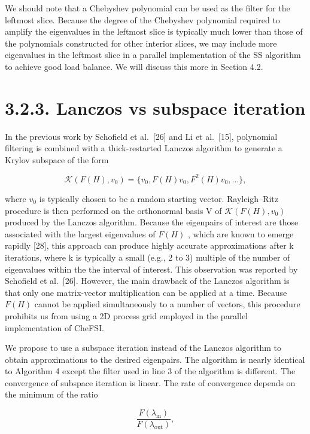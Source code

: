 \documentclass[
  10
]{article}
\begin{document}
We should note that a Chebyshev polynomial can be used as the filter for
the leftmost slice. Because the degree of the Chebyshev polynomial
required to amplify the eigenvalues in the leftmost slice is typically
much lower than those of the polynomials constructed for other interior
slices, we may include more eigenvalues in the leftmost slice in a
parallel implementation of the SS algorithm to achieve good load
balance. We will discuss this more in Section 4.2.

\section{3.2.3. Lanczos vs subspace
iteration}\label{lanczos-vs-subspace-iteration}

In the previous work by Schofield et al.~{[}26{]} and Li et
al.~{[}15{]}, polynomial filtering is combined with a thick-restarted
Lanczos algorithm to generate a Krylov subspace of the form

\[
\mathcal {K} (F (H), v _ {0}) = \{v _ {0}, F (H) v _ {0}, F ^ {2} (H) v _ {0}, \dots \}, \tag {12}
\]

where \(v _ { 0 }\) is typically chosen to be a random starting vector.
Rayleigh--Ritz procedure is then performed on the orthonormal basis V of
\(\mathcal { K } ( F ( H ) , v _ { 0 } )\) produced by the Lanczos
algorithm. Because the eigenpairs of interest are those associated with
the largest eigenvalues of \(F ( H )\) , which are known to emerge
rapidly {[}28{]}, this approach can produce highly accurate
approximations after k iterations, where k is typically a small (e.g., 2
to 3) multiple of the number of eigenvalues within the the interval of
interest. This observation was reported by Schofield et al.~{[}26{]}.
However, the main drawback of the Lanczos algorithm is that only one
matrix-vector multiplication can be applied at a time. Because
\(F ( H )\) cannot be applied simultaneously to a number of vectors,
this procedure prohibits us from using a 2D process grid employed in the
parallel implementation of CheFSI.

We propose to use a subspace iteration instead of the Lanczos algorithm
to obtain approximations to the desired eigenpairs. The algorithm is
nearly identical to Algorithm 4 except the filter used in line 3 of the
algorithm is different. The convergence of subspace iteration is linear.
The rate of convergence depends on the minimum of the ratio

\[
\frac {F (\lambda_ {\mathrm{in}})}{F (\lambda_ {\mathrm{out}})},
\]
\end{document}
